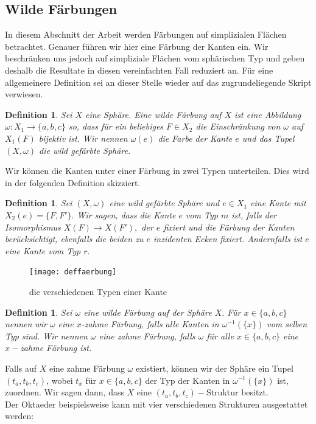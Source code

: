 \documentclass[12pt,titlepage,twoside,cleardoublepage]{article}
\theoremstyle{nummermitklammern}
\newtheorem{definition}[temp]{Definition}
\newtheorem{definition}[zahl]{Definition}
\numberwithin{equation}{section}
\begin{document}
\subsection{Wilde Färbungen}
In diesem Abschnitt der Arbeit werden Färbungen auf simplizialen Flächen betrachtet. Genauer führen wir hier eine Färbung der Kanten ein. Wir beschränken uns jedoch auf simpliziale Flächen vom sphärischen Typ und geben deshalb die Resultate in diesen vereinfachten Fall reduziert an. Für eine allgemeinere Definition sei an dieser Stelle wieder auf das zugrundeliegende Skript verwiesen.
\begin{definition}
Sei $X$ eine Sphäre. Eine \emph{wilde Färbung} auf $X$ ist eine Abbildung $\omega:X_1\to \{a,b,c\}$ so, dass für ein beliebiges $F\in X_2$ die Einschränkung von $\omega$ auf $X_1(F)$ bijektiv ist. Wir nennen $\omega(e)$ die \emph{Farbe} der Kante $e$ und das Tupel $(X,\omega)$ die \emph{wild gefärbte Sphäre}. 
\end{definition}
Wir können die Kanten unter einer Färbung in zwei Typen unterteilen. Dies wird in der folgenden Definition skizziert.
\begin{definition}
Sei $(X,\omega)$ eine wild gefärbte Sphäre und $e\in X_1$ eine Kante mit $X_2(e)=\{F,F'\}.$ Wir sagen, dass die Kante $e$ vom Typ $m$ ist, falls der Isomorphismus $X(F)\to X(F'),$ der $e$ fixiert und die Färbung der Kanten berücksichtigt, ebenfalls die beiden zu $e$ inzidenten Ecken fixiert. Andernfalls ist $e$ eine Kante vom Typ $r.$
\end{definition}
\begin{figure}[H]
\begin{center}
\texttt{[image: deffaerbung]}
\end{center}
\caption{die verschiedenen Typen einer Kante}
\end{figure}
\begin{definition}
Sei $\omega$ eine wilde Färbung auf der Sphäre $X.$ Für $x\in \{a,b,c\}$ nennen wir $\omega$ eine \emph{$x$-zahme} Färbung, falls  alle Kanten in $\omega^{-1}(\{x\})$ vom selben Typ sind. Wir nennen $\omega$ eine \emph{zahme Färbung}, falls $\omega$ für alle $x\in \{a,b,c\}$ eine $x-$zahme Färbung ist. 
\end{definition}
Falls auf $X$ eine zahme Färbung $\omega$ existiert, können wir der Sphäre ein Tupel $(t_a,t_b,t_c)$, wobei $t_x$ für $x\in \{a,b,c\}$ der Typ der Kanten in $\omega^{-1}(\{x\})$ ist, zuordnen. Wir sagen dann, dass $X$ eine $(t_a,t_b,t_c)-$Struktur besitzt.\\
Der Oktaeder beispielsweise kann mit vier verschiedenen Strukturen ausgestattet werden:
\end{document}
